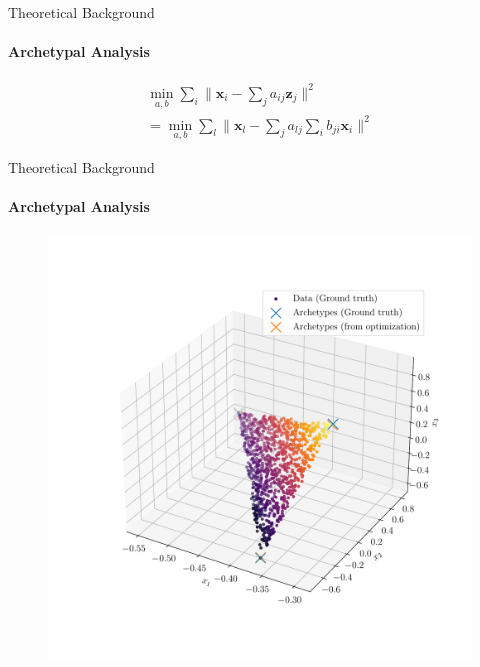 \documentclass[aspectratio=169]{beamer}
\begin{document}
\begin{frame}{Theoretical Background}
   \framesubtitle{Archetypal Analysis}
\begin{equation}
    \begin{aligned}
        \label{eq:archetype_rss}
        \min_{a,b} \sum_i \lVert \mathbf{x}_i - \sum_j a_{ij} \mathbf{z}_j
        \rVert^2 \\
        = \min_{a,b} \sum_l \lVert \mathbf{x}_l - \sum_j a_{lj} \sum_i
        b_{ji} \mathbf{x}_i \rVert^2
    \end{aligned}
\end{equation}
\end{frame}

\begin{frame}{Theoretical Background}
    \framesubtitle{Archetypal Analysis}

    \begin{figure}[htpb]
        \includegraphics[height=0.7\textheight]{beamer-figures/aa_linear_toy.pdf}
    \end{figure}
\end{frame}
\end{document}

